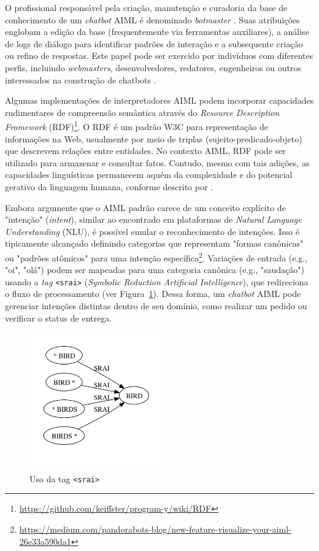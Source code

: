 \documentclass[a4paper,oneside]{book}
\begin{document}
O profissional responsável pela criação, manutenção e curadoria da base de conhecimento de um \emph{chatbot} AIML é denominado \emph{botmaster} \cite{Wallace2000}. Suas atribuições englobam a edição da base (frequentemente via ferramentas auxiliares), a análise de logs de diálogo para identificar padrões de interação e a subsequente criação ou refino de respostas. Este papel pode ser exercido por indivíduos com diferentes perfis, incluindo \emph{webmasters}, desenvolvedores, redatores, engenheiros ou outros interessados na construção de chatbots \cite{Wallace2000}.

Algumas implementações de interpretadores AIML podem incorporar capacidades rudimentares de compreensão semântica através do \emph{Resource Description Framework} (RDF)\footnote{\url{https://github.com/keiffster/program-y/wiki/RDF}}. O RDF é um padrão W3C para representação de informações na Web, usualmente por meio de triplas (sujeito-predicado-objeto) que descrevem relações entre entidades. No contexto AIML, RDF pode ser utilizado para armazenar e consultar fatos. Contudo, mesmo com tais adições, as capacidades linguísticas permanecem aquém da complexidade e do potencial gerativo da linguagem humana, conforme descrito por \cite{chomsky2002syntactic}.

Embora \cite{Hohn2019} argumente que o AIML padrão carece de um conceito explícito de "intenção" (\emph{intent}), similar ao encontrado em plataformas de \emph{Natural Language Understanding} (NLU), é possível emular o reconhecimento de intenções. Isso é tipicamente alcançado definindo categorias que representam "formas canônicas" ou "padrões atômicos" para uma intenção específica\footnote{\url{https://medium.com/pandorabots-blog/new-feature-visualize-your-aiml-26e33a590da1}}. Variações de entrada (e.g., "oi", "olá") podem ser mapeadas para uma categoria canônica (e.g., "saudação") usando a \emph{tag} \texttt{<srai>} (\emph{Symbolic Reduction Artificial Intelligence}), que redireciona o fluxo de processamento (ver Figura~\ref{fig:sodatagsrai}). Dessa forma, um \emph{chatbot} AIML pode gerenciar intenções distintas dentro de seu domínio, como realizar um pedido ou verificar o status de entrega.

\begin{figure}
    \centering
    \caption{Uso da tag \texttt{<srai>}}
    \includegraphics[width=0.5\textwidth]{./04-figuras/image13} %
    \label{fig:sodatagsrai}
    \vspace{0.2cm} %
    {\footnotesize \cite{DeGasperis2013}}
\end{figure}
\end{document}
